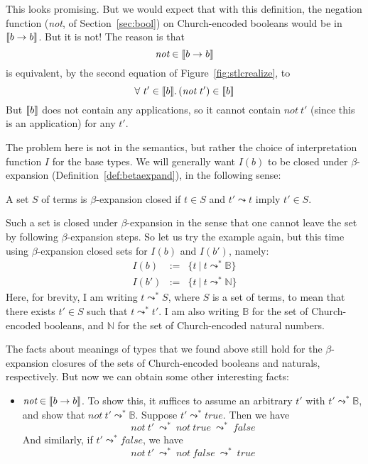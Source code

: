 \noindent This looks promising.  But we would expect that with this definition, the negation
function (\textit{not}, of Section~\ref{sec:bool}) on Church-encoded booleans
would be in $\llbracket b\to b \rrbracket$.  But it is not!  The reason is that
\[
\textit{not}\in\llbracket b \to b \rrbracket
\]
\noindent is equivalent, by the second equation of Figure~\ref{fig:stlcrealize}, to
\[
\all{t'\in\interp{b}}{(\textit{not}\ t')\in\interp{b}}
\]
\noindent But $\llbracket b \rrbracket$ does not contain any applications, so it
cannot contain $\textit{not}\ t'$ (since this is an application) for
any $t'$.

The problem here is not in the semantics, but rather the choice of
interpretation function $I$ for the base types.  We will generally
want $I(b)$ to be closed under $\beta$-expansion (Definition~\ref{def:betaexpand}), in the following sense:

\begin{definition}
  A set $S$ of terms is $\beta$-expansion closed if $t\in S$ and $t'
  \leadsto t$ imply $t' \in S$.
\end{definition}

Such a set is closed under $\beta$-expansion in the sense that one cannot leave the
set by following $\beta$-expansion steps.  So let us try the example again,
but this time using $\beta$-expansion closed sets for $I(b)$ and $I(b')$,
namely:
\[
\begin{array}{lll}
  I(b) & := & \{ t\ |\ t \leadsto^* \mathbb{B}\} \\
  I(b') & := & \{ t\ |\ t \leadsto^* \mathbb{N}\} 
\end{array}
\]
\noindent Here, for brevity, I am writing $t \leadsto^* S$, where $S$
is a set of terms, to mean that there exists $t'\in S$ such that
$t\leadsto^* t'$.  I am also writing $\mathbb{B}$ for the set of
Church-encoded booleans, and $\mathbb{N}$ for the set of
Church-encoded natural numbers.

The facts about meanings of types that we found above still hold for the
$\beta$-expansion closures of the sets of Church-encoded booleans and naturals,
respectively.  But now we can obtain some other interesting facts:
\begin{itemize}
\item $\textit{not}\in\llbracket b\to b \rrbracket$.  To show this, it suffices to
  assume an arbitrary $t'$ with $t'\leadsto^*\mathbb{B}$, and show
  that $\textit{not}\ t'\leadsto^*\mathbb{B}$. Suppose $t'\leadsto^*\textit{true}$.
  Then we have
  \[
  \textit{not}\ t' \ \leadsto^*\  \textit{not}\ \textit{true}\ \leadsto^*\ \textit{false}
  \]
  \noindent And similarly, if $t'\leadsto^*\textit{false}$, we have
  \[
  \textit{not}\ t' \ \leadsto^*\  \textit{not}\ \textit{false}\ \leadsto^*\ \textit{true}
  \]
\end{itemize}

